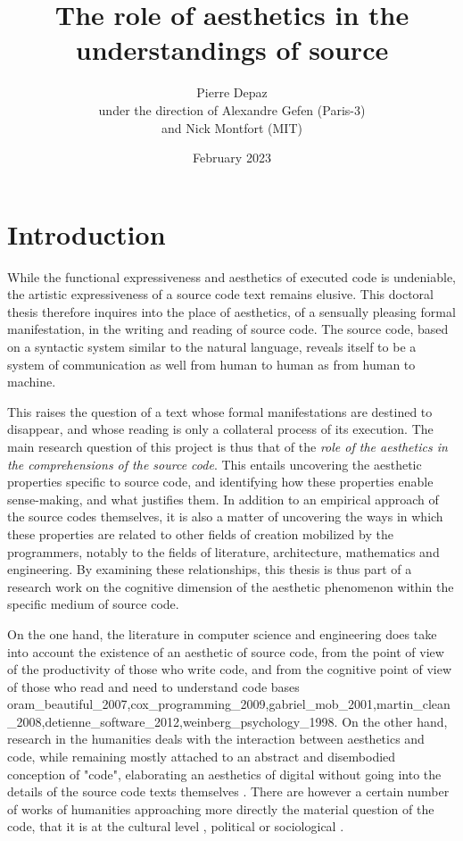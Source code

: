 \documentclass{article}
\begin{document}
\title{The role of aesthetics in the understandings of source}
\author{Pierre Depaz\\under the direction of Alexandre Gefen (Paris-3)\\and Nick Montfort (MIT)}
\date{February 2023}
\maketitle

\section{Introduction}

While the functional expressiveness and aesthetics of executed code is undeniable, the artistic expressiveness of a source code text remains elusive. This doctoral thesis therefore inquires into the place of aesthetics, of a sensually pleasing formal manifestation, in the writing and reading of source code. The source code, based on a syntactic system similar to the natural language, reveals itself to be a system of communication as well from human to human as from human to machine.

This raises the question of a text whose formal manifestations are destined to disappear, and whose reading is only a collateral process of its execution. The main research question of this project is thus that of the \emph{role of the aesthetics in the comprehensions of the source code}. This entails uncovering the aesthetic properties specific to source code, and identifying how these properties enable sense-making, and what justifies them. In addition to an empirical approach of the source codes themselves, it is also a matter of uncovering the ways in which these properties are related to other fields of creation mobilized by the programmers, notably to the fields of literature, architecture, mathematics and engineering. By examining these relationships, this thesis is thus part of a research work on the cognitive dimension of the aesthetic phenomenon within the specific medium of source code.

On the one hand, the literature in computer science and engineering does take into account the existence of an aesthetic of source code, from the point of view of the productivity of those who write code, and from the cognitive point of view of those who read and need to understand code bases {oram_beautiful_2007,cox_programming_2009,gabriel_mob_2001,martin_clean_2008,detienne_software_2012,weinberg_psychology_1998}. On the other hand, research in the humanities deals with the interaction between aesthetics and code, while remaining mostly attached to an abstract and disembodied conception of "code", elaborating an aesthetics of digital without going into the details of the source code texts themselves \citep{cramer_exe_2019,hayles_my_2010,mackenzie_cutting_2006,levy_programming_1992}. There are however a certain number of works of humanities approaching more directly the material question of the code, that it is at the cultural level \citep{montfort_10_2014}, political \citep{cox_speaking_2013} or sociological \citep{paloque-berges_poetique_2009}.
\end{document}
